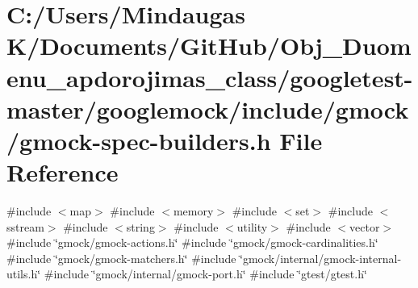 \hypertarget{googletest-master_2googlemock_2include_2gmock_2gmock-spec-builders_8h}{}\section{C\+:/\+Users/\+Mindaugas K/\+Documents/\+Git\+Hub/\+Obj\+\_\+\+Duomenu\+\_\+apdorojimas\+\_\+class/googletest-\/master/googlemock/include/gmock/gmock-\/spec-\/builders.h File Reference}
\label{googletest-master_2googlemock_2include_2gmock_2gmock-spec-builders_8h}
{\ttfamily \#include $<$map$>$}\newline
{\ttfamily \#include $<$memory$>$}\newline
{\ttfamily \#include $<$set$>$}\newline
{\ttfamily \#include $<$sstream$>$}\newline
{\ttfamily \#include $<$string$>$}\newline
{\ttfamily \#include $<$utility$>$}\newline
{\ttfamily \#include $<$vector$>$}\newline
{\ttfamily \#include \char`\"{}gmock/gmock-\/actions.\+h\char`\"{}}\newline
{\ttfamily \#include \char`\"{}gmock/gmock-\/cardinalities.\+h\char`\"{}}\newline
{\ttfamily \#include \char`\"{}gmock/gmock-\/matchers.\+h\char`\"{}}\newline
{\ttfamily \#include \char`\"{}gmock/internal/gmock-\/internal-\/utils.\+h\char`\"{}}\newline
{\ttfamily \#include \char`\"{}gmock/internal/gmock-\/port.\+h\char`\"{}}\newline
{\ttfamily \#include \char`\"{}gtest/gtest.\+h\char`\"{}}\newline
